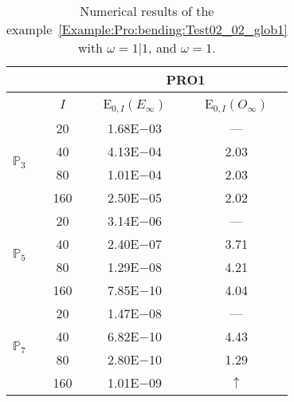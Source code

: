 \begin{table}[H]
\caption{Numerical results of the example~\ref{Example:Pro:bending:Test02_02_glob1} with $\omega=1|1$, and $\omega=1$.}
\setlength{\tabcolsep}{5pt}
\centering
\begin{tabular}{@{}l c c c@{}}
\toprule
 &  & \multicolumn{2}{c}{PRO1}\\
\midrule
 & $I$ & E$_{0,I}(E_{\infty})$ & E$_{0,I}(O_{\infty})$\\
\midrule
\multirow{4}{*}{$\mathbb{P}_{3}$} & 20 & 1.68E$-$03 & ---\\
 & 40 & 4.13E$-$04 & 2.03\\
 & 80 & 1.01E$-$04 & 2.03\\
 & 160 & 2.50E$-$05 & 2.02\\
\midrule
\multirow{4}{*}{$\mathbb{P}_{5}$} & 20 & 3.14E$-$06 & ---\\
 & 40 & 2.40E$-$07 & 3.71\\
 & 80 & 1.29E$-$08 & 4.21\\
 & 160 & 7.85E$-$10 & 4.04\\
\midrule
\multirow{4}{*}{$\mathbb{P}_{7}$} & 20 & 1.47E$-$08 & ---\\
 & 40 & 6.82E$-$10 & 4.43\\
 & 80 & 2.80E$-$10 & 1.29\\
 & 160 & 1.01E$-$09 & $\uparrow$\\
\bottomrule
\end{tabular}
\label{Table:PRO:test_02_02_test17}
\end{table}
